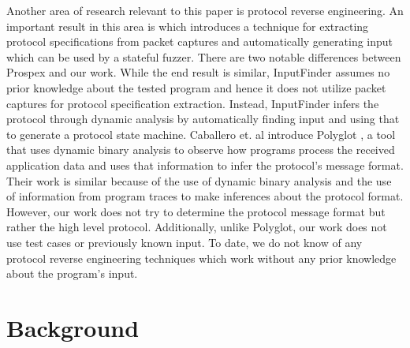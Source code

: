 \documentclass{sig-alternate-05-2015}
\def \tool {InputFinder}
\begin{document}
Another area of research relevant to this paper is protocol reverse engineering.
An important result in this area is \cite{prospex} which introduces a technique for extracting protocol specifications from packet captures and automatically generating input which can be used by a stateful fuzzer.
There are two notable differences between Prospex and our work.
While the end result is similar, \tool{} assumes no prior knowledge about the tested program and hence it does not utilize packet captures for protocol specification extraction.
Instead, \tool{} infers the protocol through dynamic analysis by automatically finding input and using that to generate a protocol state machine.
Caballero et. al introduce Polyglot \cite{polyglot}, a tool that uses dynamic binary analysis to observe how programs process the received application data and uses that information to infer the protocol's message format.
Their work is similar because of the use of dynamic binary analysis and the use of information from program traces to make inferences about the protocol format.
However, our work does not try to determine the protocol message format but rather the high level protocol.
Additionally, unlike Polyglot, our work does not use test cases or previously known input.
To date, we do not know of any protocol reverse engineering techniques which work without any prior knowledge about the program's input.

\section{Background} \label{background}

\end{document}
